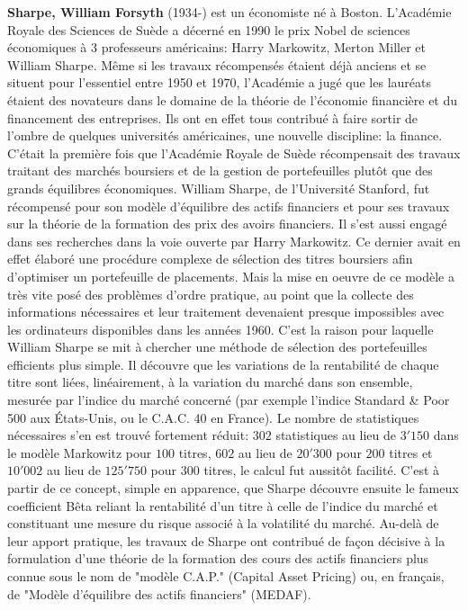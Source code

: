 \textbf{Sharpe, William Forsyth} (1934-) est un économiste né à Boston. L'Académie Royale des Sciences de Suède a décerné en 1990 le prix Nobel de sciences économiques à 3 professeurs américains: Harry Markowitz, Merton Miller et William Sharpe. Même si les travaux récompensés étaient déjà anciens et se situent pour l'essentiel entre 1950 et 1970, l'Académie a jugé que les lauréats étaient des novateurs dans le domaine de la théorie de l'économie financière et du financement des entreprises. Ils ont en effet tous contribué à faire sortir de l'ombre de quelques universités américaines, une nouvelle discipline: la finance. C'était la première fois que l'Académie Royale de Suède récompensait des travaux traitant des marchés boursiers et de la gestion de portefeuilles plutôt que des grands équilibres économiques. William Sharpe, de l'Université Stanford, fut récompensé pour son modèle d'équilibre des actifs financiers et pour ses travaux sur la théorie de la formation des prix des avoirs financiers. Il s'est aussi engagé dans ses recherches dans la voie ouverte par Harry Markowitz. Ce dernier avait en effet élaboré une procédure complexe de sélection des titres boursiers afin d'optimiser un portefeuille de placements. Mais la mise en oeuvre de ce modèle a très vite posé des problèmes d'ordre pratique, au point que la collecte des informations nécessaires et leur traitement devenaient presque impossibles avec les ordinateurs disponibles dans les années 1960. C'est la raison pour laquelle William Sharpe se mit à chercher une méthode de sélection des portefeuilles efficients plus simple. Il découvre que les variations de la rentabilité de chaque titre sont liées, linéairement, à la variation du marché dans son ensemble, mesurée par l'indice du marché concerné (par exemple l'indice Standard \& Poor 500 aux États-Unis, ou le C.A.C. 40 en France). Le nombre de statistiques nécessaires s'en est trouvé fortement réduit: $302$ statistiques au lieu de $3'150$ dans le modèle Markowitz pour $100$ titres, $602$ au lieu de $20'300$ pour $200$ titres et $10'002$ au lieu de $125'750$ pour $300$ titres, le calcul fut aussitôt facilité. C'est à partir de ce concept, simple en apparence, que Sharpe découvre ensuite le fameux coefficient Bêta reliant la rentabilité d'un titre à celle de l'indice du marché et constituant une mesure du risque associé à la volatilité du marché. Au-delà de leur apport pratique, les travaux de Sharpe ont contribué de façon décisive à la formulation d'une théorie de la formation des cours des actifs financiers plus connue sous le nom de "modèle C.A.P." (Capital Asset Pricing) ou, en français, de "Modèle d'équilibre des actifs financiers" (MEDAF).

